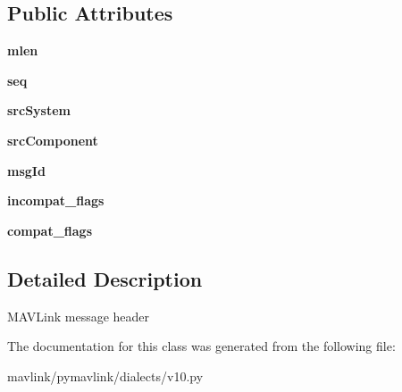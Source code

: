 \subsection*{Public Attributes}
\begin{DoxyCompactItemize}
\item 
\mbox{\label{classpymavlink_1_1dialects_1_1v10_1_1MAVLink__header_a9f7ce71013219ecfaee9b3a5c738bfac}} 
{\bfseries mlen}
\item 
\mbox{\label{classpymavlink_1_1dialects_1_1v10_1_1MAVLink__header_a5957ac291959f230d95d2ff11f455ac7}} 
{\bfseries seq}
\item 
\mbox{\label{classpymavlink_1_1dialects_1_1v10_1_1MAVLink__header_a53ab6917c84092f9e3432a0c5a773856}} 
{\bfseries src\+System}
\item 
\mbox{\label{classpymavlink_1_1dialects_1_1v10_1_1MAVLink__header_aaa9a6c76693936e9b952084d70a282a2}} 
{\bfseries src\+Component}
\item 
\mbox{\label{classpymavlink_1_1dialects_1_1v10_1_1MAVLink__header_ae01461692b3f8f5627928f90fc6d4d37}} 
{\bfseries msg\+Id}
\item 
\mbox{\label{classpymavlink_1_1dialects_1_1v10_1_1MAVLink__header_a224ad5f7f661661504b73999bb3dbe21}} 
{\bfseries incompat\+\_\+flags}
\item 
\mbox{\label{classpymavlink_1_1dialects_1_1v10_1_1MAVLink__header_a4b8bc268bb91f84295a62042db7d61ae}} 
{\bfseries compat\+\_\+flags}
\end{DoxyCompactItemize}


\subsection{Detailed Description}
\begin{DoxyVerb}MAVLink message header\end{DoxyVerb}
 

The documentation for this class was generated from the following file\+:\begin{DoxyCompactItemize}
\item 
mavlink/pymavlink/dialects/v10.\+py\end{DoxyCompactItemize}
